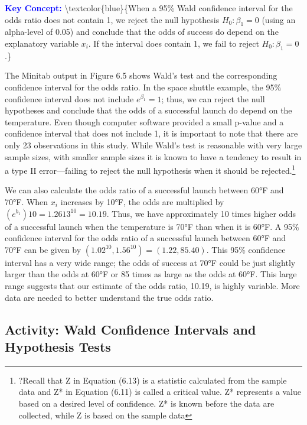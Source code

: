 \documentclass[
]{book}
\begin{document}
\textbf{\textcolor{blue}{Key Concept:}} \textbackslash textcolor\{blue\}\{When a 95\% Wald confidence interval for the odds ratio does not contain 1, we reject the null hypothesis \(H_0: \beta_1 = 0\) (using an alpha-level of 0.05) and conclude that the odds of success do depend on the explanatory variable \(x_i\). If the interval does contain 1, we fail to reject \(H_0: \beta_1 = 0\).\}

The Minitab output in Figure 6.5 shows Wald's test and the corresponding confidence interval for the
odds ratio. In the space shuttle example, the 95\% confidence interval does not include \(e^{\beta_1} = 1\); thus, we can reject the null hypotheses and conclude that the odds of a successful launch do depend on the temperature. Even though computer software provided a small p-value and a confidence interval that does not include 1, it is important to note that there are only 23 observations in this study. While Wald's test is reasonable with very large sample sizes, with smaller sample sizes it is known to have a tendency to result in a type II error---failing to reject the null hypothesis when it should be rejected.\footnote{?Recall that Z in Equation (6.13) is a statistic calculated from the sample data and Z* in Equation (6.11) is called a critical value. Z* represents a value based on a desired level of confidence. Z* is known before the data are collected, while Z is based on the sample data}

We can also calculate the odds ratio of a successful launch between 60°F and 70°F. When \(x_i\)
increases by 10°F, the odds are multiplied by \((e^{b_1})10 = 1.2613^{10} = 10.19\). Thus, we have approximately 10 times higher odds of a successful launch when the temperature is 70°F than when it is 60°F. A 95\% confidence interval for the odds ratio of a successful launch between 60°F and 70°F can be given by \((1.02^10, 1.56^10) = (1.22, 85.40)\). This 95\% confidence interval has a very wide range; the odds of success at 70°F could be just slightly larger than the odds at 60°F or 85 times as large as the odds at 60°F. This large range suggests that our estimate of the odds ratio, 10.19, is highly variable. More data are needed to better understand the true odds ratio.

\hypertarget{activity-wald-confidence-intervals-and-hypothesis-tests}{%
\subsection*{Activity: Wald Confidence Intervals and Hypothesis Tests}\label{activity-wald-confidence-intervals-and-hypothesis-tests}}
\end{document}
